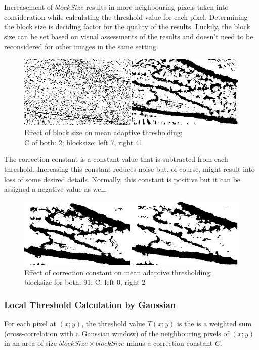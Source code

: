 Increasement of $blockSize$ results in more neighbouring pixels taken into consideration while calculating the threshold value for each pixel. Determining the block size is deciding factor for the quality of the results. Luckily, the block size can be set based on visual assessments of the results and doesn’t need to be reconsidered for other images in the same setting. 

\begin{figure}[H]
\centering
\includegraphics[scale=0.8]{figures/compare1.JPG}
\captionsetup{justification=centering}
\caption[Effect of block size on mean adaptive thresholding]{Effect of block size on mean adaptive thresholding;\\C of both: 2; blocksize: left 7, right 41}\label{fig:compare1}
\end{figure}

The correction constant is a constant value that is subtracted from each threshold. Increasing this constant reduces noise but, of course, might result into loss of some desired details. Normally, this constant is positive but it can be assigned a negative value as well.

\begin{figure}[H]
\centering
\includegraphics[scale=0.8]{figures/compare2.JPG}
\captionsetup{justification=centering}

\caption[Effect of correction constant on mean adaptive thresholding]{Effect of correction constant on mean adaptive thresholding;\\ blocksize for both: 91; C: left 0, right 2}\label{fig:compare2}
\end{figure}

\subsubsection{Local Threshold Calculation by Gaussian}
For each pixel at $(x; y)$, the threshold value $T(x; y)$ is the is a weighted sum (cross-correlation with a Gaussian window) of the neighbouring pixels of $(x; y)$ in an area of size $blockSize \times blockSize$ minus a correction constant $C$. 

